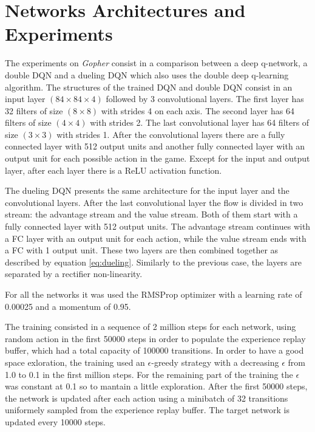 \documentclass[article,11pt]{article}
\begin{document}
	
	\section{Networks Architectures and Experiments}
	The experiments on \textit{Gopher} consist in a comparison between a deep q-network, a double DQN and a dueling DQN which also uses the double deep q-learning algorithm. The structures of the trained DQN and double DQN consist in an input layer $(84\times84\times4)$ followed by 3 convolutional layers. The first layer has 32 filters of size $(8\times8)$ with strides 4 on each axis. The second layer has 64 filters of size $(4\times4)$ with strides 2. The last convolutional layer has 64 filters  of size $(3\times3)$ with strides 1. After the convolutional layers there are a fully connected layer with 512 output units and another fully connected layer with an output unit for each possible action in the game. Except for the input and output layer, after each layer there is a ReLU activation function.
	
	The dueling DQN presents the same architecture for the input layer and the convolutional layers. After the last convolutional layer the flow is divided in two stream: the advantage stream and the value stream. Both of them start with a fully connected layer with 512 output units. The advantage stream continues with a FC layer with an output unit for each action, while the value stream ends with a FC with 1 output unit. These two layers are then combined together as described by equation \ref{eq:dueling}. Similarly to the previous case, the layers are separated by a rectifier non-linearity.
	
	For all the networks it was used the RMSProp optimizer with a learning rate of 0.00025 and a momentum of 0.95.
	
	The training consisted in a sequence of 2 million steps for each network, using random action in the first 50000 steps in order to populate the experience replay buffer, which had a total capacity of 100000 transitions. In order to have a good space exloration, the training used an $\epsilon$-greedy strategy with a decreasing $\epsilon$ from 1.0 to 0.1 in the first million steps. For the remaining part of the training the $\epsilon$ was constant at 0.1 so to mantain a little exploration. After the first 50000 steps, the network is updated after each action using a minibatch of 32 transitions uniformely sampled from the experience replay buffer. The target network is updated every 10000 steps.
	
\end{document}
